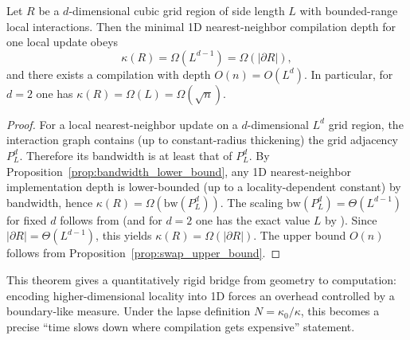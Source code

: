 \begin{theorem}
\label{thm:boundary_scaling_overhead}
Let $R$ be a $d$-dimensional cubic grid region of side length $L$ with bounded-range local interactions.
Then the minimal 1D nearest-neighbor compilation depth for one local update obeys
\begin{equation}
\kappa(R)=\Omega(L^{d-1})=\Omega(|\partial R|),
\end{equation}
and there exists a compilation with depth $O(n)=O(L^d)$.
In particular, for $d=2$ one has $\kappa(R)=\Omega(L)=\Omega(\sqrt{n})$.
\end{theorem}

\begin{proof}
For a local nearest-neighbor update on a $d$-dimensional $L^d$ grid region, the interaction graph contains (up to constant-radius thickening) the grid adjacency $P_L^d$.
Therefore its bandwidth is at least that of $P_L^d$.
By Proposition~\ref{prop:bandwidth_lower_bound}, any 1D nearest-neighbor implementation depth is lower-bounded (up to a locality-dependent constant) by bandwidth, hence $\kappa(R)=\Omega(\mathrm{bw}(P_L^d))$.
The scaling $\mathrm{bw}(P_L^d)=\Theta(L^{d-1})$ for fixed $d$ follows from \cite{BilleraBlanco2013} (and for $d=2$ one has the exact value $L$ by \cite{Chvatalova1975}).
Since $|\partial R|=\Theta(L^{d-1})$, this yields $\kappa(R)=\Omega(|\partial R|)$.
The upper bound $O(n)$ follows from Proposition~\ref{prop:swap_upper_bound}.
\end{proof}

This theorem gives a quantitatively rigid bridge from geometry to computation: encoding higher-dimensional locality into 1D forces an overhead controlled by a boundary-like measure.
Under the lapse definition $N=\kappa_0/\kappa$, this becomes a precise ``time slows down where compilation gets expensive'' statement.
